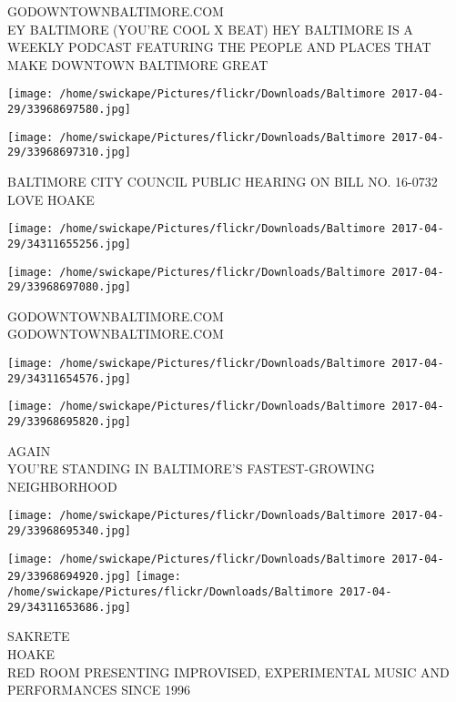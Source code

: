 \documentclass[10pt,letterpaper]{article}
\begin{document}
GODOWNTOWNBALTIMORE.COM\\
EY BALTIMORE (YOU'RE COOL X BEAT) HEY BALTIMORE IS A WEEKLY PODCAST FEATURING THE PEOPLE AND PLACES THAT MAKE DOWNTOWN BALTIMORE GREAT\\
\pagebreak

\texttt{[image: /home/swickape/Pictures/flickr/Downloads/Baltimore 2017-04-29/33968697580.jpg]}

\vspace{0.25in}
\texttt{[image: /home/swickape/Pictures/flickr/Downloads/Baltimore 2017-04-29/33968697310.jpg]}

BALTIMORE CITY COUNCIL PUBLIC HEARING ON BILL NO. 16{-}0732\\
LOVE HOAKE\\
\pagebreak

\texttt{[image: /home/swickape/Pictures/flickr/Downloads/Baltimore 2017-04-29/34311655256.jpg]}

\vspace{0.25in}
\texttt{[image: /home/swickape/Pictures/flickr/Downloads/Baltimore 2017-04-29/33968697080.jpg]}

GODOWNTOWNBALTIMORE.COM\\
GODOWNTOWNBALTIMORE.COM\\
\pagebreak

\texttt{[image: /home/swickape/Pictures/flickr/Downloads/Baltimore 2017-04-29/34311654576.jpg]}

\vspace{0.25in}
\texttt{[image: /home/swickape/Pictures/flickr/Downloads/Baltimore 2017-04-29/33968695820.jpg]}

AGAIN\\
YOU'RE STANDING IN BALTIMORE'S FASTEST{-}GROWING NEIGHBORHOOD\\
\pagebreak

\texttt{[image: /home/swickape/Pictures/flickr/Downloads/Baltimore 2017-04-29/33968695340.jpg]}

\vspace{0.25in}
\texttt{[image: /home/swickape/Pictures/flickr/Downloads/Baltimore 2017-04-29/33968694920.jpg]}
\texttt{[image: /home/swickape/Pictures/flickr/Downloads/Baltimore 2017-04-29/34311653686.jpg]}

SAKRETE\\
HOAKE\\
RED ROOM PRESENTING IMPROVISED, EXPERIMENTAL MUSIC AND PERFORMANCES SINCE 1996\\
\pagebreak
\end{document}
